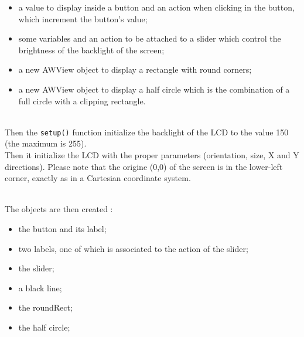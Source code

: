 \documentclass[a4paper,11pt]{extarticle}
\begin{document}
\begin{itemize}
\item  a value to display inside a button and an action when clicking in the button, which increment the button's value; 
 \item some variables and an action to be attached to a slider which control the brightness of the backlight of the screen;
 \item a new AWView object to display a rectangle with round corners;
 \item a new AWView object to display a half circle which is the combination of a full circle with a clipping rectangle.
\end{itemize}

~\\Then the \texttt{setup()} function initialize the backlight of the LCD to the value 150 (the maximum is 255). 
~\\Then it initialize the LCD with the proper parameters (orientation, size, X and Y directions). Please note that the origine (0,0) of the screen is in the lower-left corner, exactly as in a Cartesian coordinate system.

~\\The objects are then created :

\begin{itemize}
\item  the button and its label; 
 \item two labels, one of which is associated to the action of the slider;
 \item the slider;
 \item a black line;
 \item the roundRect;
 \item the half circle;
\end{itemize}
\end{document}
